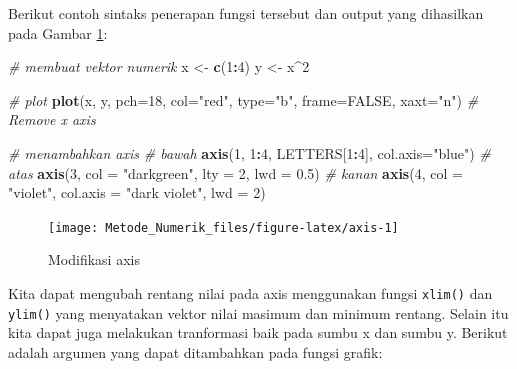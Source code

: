 \documentclass[
]{book}
\newenvironment{Shaded}{\begin{snugshade}}{\end{snugshade}}
\newcommand{\AttributeTok}[1]{\textcolor[rgb]{0.13,0.29,0.53}{#1}}
\newcommand{\CommentTok}[1]{\textcolor[rgb]{0.56,0.35,0.01}{\textit{#1}}}
\newcommand{\ConstantTok}[1]{\textcolor[rgb]{0.56,0.35,0.01}{#1}}
\newcommand{\DecValTok}[1]{\textcolor[rgb]{0.00,0.00,0.81}{#1}}
\newcommand{\FloatTok}[1]{\textcolor[rgb]{0.00,0.00,0.81}{#1}}
\newcommand{\FunctionTok}[1]{\textcolor[rgb]{0.13,0.29,0.53}{\textbf{#1}}}
\newcommand{\NormalTok}[1]{#1}
\newcommand{\OtherTok}[1]{\textcolor[rgb]{0.56,0.35,0.01}{#1}}
\newcommand{\SpecialCharTok}[1]{\textcolor[rgb]{0.81,0.36,0.00}{\textbf{#1}}}
\newcommand{\StringTok}[1]{\textcolor[rgb]{0.31,0.60,0.02}{#1}}
\theoremstyle{definition}
\theoremstyle{definition}
\theoremstyle{definition}
\theoremstyle{definition}
\theoremstyle{remark}
\begin{document}
Berikut contoh sintaks penerapan fungsi tersebut dan output yang dihasilkan pada Gambar \ref{fig:axis}:

\begin{Shaded}
\begin{Highlighting}[]
\CommentTok{\# membuat vektor numerik}
\NormalTok{x }\OtherTok{\textless{}{-}} \FunctionTok{c}\NormalTok{(}\DecValTok{1}\SpecialCharTok{:}\DecValTok{4}\NormalTok{)}
\NormalTok{y }\OtherTok{\textless{}{-}}\NormalTok{ x}\SpecialCharTok{\^{}}\DecValTok{2}

\CommentTok{\# plot}
\FunctionTok{plot}\NormalTok{(x, y, }\AttributeTok{pch=}\DecValTok{18}\NormalTok{, }\AttributeTok{col=}\StringTok{"red"}\NormalTok{, }\AttributeTok{type=}\StringTok{"b"}\NormalTok{,}
     \AttributeTok{frame=}\ConstantTok{FALSE}\NormalTok{, }\AttributeTok{xaxt=}\StringTok{"n"}\NormalTok{) }\CommentTok{\# Remove x axis}

\CommentTok{\# menambahkan axis}
\CommentTok{\# bawah}
\FunctionTok{axis}\NormalTok{(}\DecValTok{1}\NormalTok{, }\DecValTok{1}\SpecialCharTok{:}\DecValTok{4}\NormalTok{, LETTERS[}\DecValTok{1}\SpecialCharTok{:}\DecValTok{4}\NormalTok{], }\AttributeTok{col.axis=}\StringTok{"blue"}\NormalTok{)}
\CommentTok{\# atas}
\FunctionTok{axis}\NormalTok{(}\DecValTok{3}\NormalTok{, }\AttributeTok{col =} \StringTok{"darkgreen"}\NormalTok{, }\AttributeTok{lty =} \DecValTok{2}\NormalTok{, }\AttributeTok{lwd =} \FloatTok{0.5}\NormalTok{)}
\CommentTok{\# kanan}
\FunctionTok{axis}\NormalTok{(}\DecValTok{4}\NormalTok{, }\AttributeTok{col =} \StringTok{"violet"}\NormalTok{, }\AttributeTok{col.axis =} \StringTok{"dark violet"}\NormalTok{, }\AttributeTok{lwd =} \DecValTok{2}\NormalTok{)}
\end{Highlighting}
\end{Shaded}

\begin{figure}

{\centering \texttt{[image: Metode\_Numerik\_files/figure-latex/axis-1]} 

}

\caption{Modifikasi axis}\label{fig:axis}
\end{figure}

Kita dapat mengubah rentang nilai pada axis menggunakan fungsi \texttt{xlim()} dan \texttt{ylim()} yang menyatakan vektor nilai masimum dan minimum rentang. Selain itu kita dapat juga melakukan tranformasi baik pada sumbu x dan sumbu y. Berikut adalah argumen yang dapat ditambahkan pada fungsi grafik:
\end{document}
